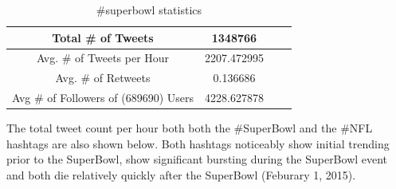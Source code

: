 \documentclass[12pt]{article}
\begin{document}
\begin{table}[h]
	\centering
	\begin{tabular}{| c | c | c | c |}
		\hline 
		Total \# of Tweets & 1348766 \\\hline
		Avg. \# of Tweets per Hour & 2207.472995 \\\hline
		Avg. \# of Retweets & 0.136686 \\\hline
		Avg \# of Followers of (689690) Users & 4228.627878 \\\hline
	\end{tabular} 
	\caption{\#superbowl statistics}
	\label{part1:tab1}
\end{table} 


The total tweet count per hour both both the \#SuperBowl and the \#NFL hashtags are also shown below. Both hashtags noticeably show initial trending prior to the SuperBowl, show significant bursting during the SuperBowl event and both die relatively quickly after the SuperBowl (Feburary 1, 2015).
\end{document}
